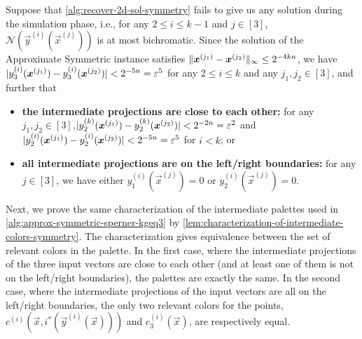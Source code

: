 Suppose that \cref{alg:recover-2d-sol-symmetry} fails to give us any solution during the simulation phase, i.e., for any $2\leq i\leq k-1$ and $j\in [3]$, $\mathcal{N}(\vec{y}^{(i)}(\vec{x}^{(j)}))$ is at most bichromatic. 
Since the solution of the \outofk Approximate Symmetric \Sperner instance satisfies $\| {\boldsymbol{x}^{(j_1)}-\boldsymbol{x}^{(j_2)}} \|_{\infty}\leq 2^{-4kn}$, we have $|{y_3^{(i)}(\boldsymbol{x}^{(j_1)})-y_3^{(i)}(\boldsymbol{x}^{(j_2)})} | < 2^{-5n}=\varepsilon^5$ for any $2\leq i\leq k$ and any $j_1,j_2\in [3]$, and further that
\begin{itemize}[itemsep=0.2em, topsep=0.5em]
    \item {\bf the intermediate projections are close to each other:} for any $j_1,j_2\in [3]$,$|{y_2^{(k)}(\boldsymbol{x}^{(j_1)})-y_2^{(k)}(\boldsymbol{x}^{(j_2)})} |<2^{-2n}=\varepsilon^2$ and $|{y_2^{(i)}(\boldsymbol{x}^{(j_1)})-y_2^{(i)}(\boldsymbol{x}^{(j_2)})} |<2^{-5n}=\varepsilon^5$ for $i<k$; or
    \item {\bf all intermediate projections are on the left/right boundaries:} for any $j\in [3]$, we have either $y_1^{(i)}(\vec{x}^{(j)})=0$ or $y_2^{(i)}(\vec{x}^{(j)})=0$.
\end{itemize}

Next, we prove the same characterization of the intermediate palettes used in \cref{alg:approx-symmetric-sperner-kgeq3} by \cref{lem:characterization-of-intermediate-colors-symmetry}.
The characterization gives equivalence between the set of relevant colors in the palette.
In the first case, where the intermediate projections of the three input vectors are close to each other (and at least one of them is not on the left/right boundaries), the palettes are exactly the same.
In the second case, where the intermediate projections of the input vectors are all on the left/right boundaries, the only two relevant colors for the points, $c^{(i)}(\vec{x}, i^*(\vec{y}^{(i)}(\vec{x})))$ and $c^{(i)}_3(\vec{x})$, are respectively equal. 

